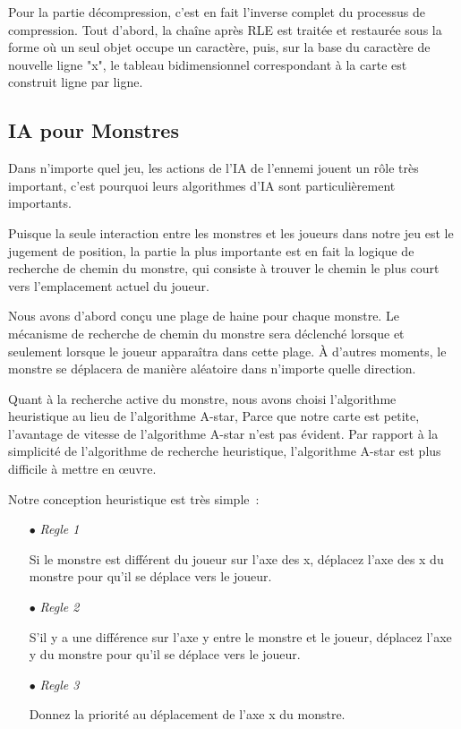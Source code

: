 \documentclass[11pt,english]{article}
\begin{document}
\large

Pour la partie décompression, c’est en fait l’inverse complet du processus de compression. Tout d'abord, la chaîne après RLE est traitée et restaurée sous la forme où un seul objet occupe un caractère, puis, sur la base du caractère de nouvelle ligne "x", le tableau bidimensionnel correspondant à la carte est construit ligne par ligne.


\subsection{IA pour Monstres}

\indent 

Dans n'importe quel jeu, les actions de l'IA de l'ennemi jouent un rôle très important, c'est pourquoi leurs algorithmes d'IA sont particulièrement importants.

\indent Puisque la seule interaction entre les monstres et les joueurs dans notre jeu est le jugement de position, la partie la plus importante est en fait la logique de recherche de chemin du monstre, qui consiste à trouver le chemin le plus court vers l'emplacement actuel du joueur.

\indent Nous avons d'abord conçu une plage de haine pour chaque monstre. Le mécanisme de recherche de chemin du monstre sera déclenché lorsque et seulement lorsque le joueur apparaîtra dans cette plage. À d'autres moments, le monstre se déplacera de manière aléatoire dans n'importe quelle direction.

\indent Quant à la recherche active du monstre, nous avons choisi l'algorithme heuristique au lieu de l'algorithme A-star, Parce que notre carte est petite, l'avantage de vitesse de l'algorithme A-star n'est pas évident. Par rapport à la simplicité de l'algorithme de recherche heuristique, l'algorithme A-star est plus difficile à mettre en œuvre.

\indent Notre conception heuristique est très simple :

\small
{
\begin{itemize}
    \item [$\bullet$] \textit{Regle 1}
    
    Si le monstre est différent du joueur sur l'axe des x, déplacez l'axe des x du monstre pour qu'il se déplace vers le joueur.

    \item [$\bullet$] \textit{Regle 2}
    
    S'il y a une différence sur l'axe y entre le monstre et le joueur, déplacez l'axe y du monstre pour qu'il se déplace vers le joueur.

    \item [$\bullet$] \textit{Regle 3}
    
    Donnez la priorité au déplacement de l’axe x du monstre.

\end{itemize}
}
\end{document}
